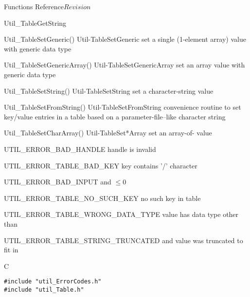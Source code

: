 \begin{cactuspart}{ Functions Reference}{}{$Revision$}
\begin{FunctionDescription}{Util\_TableGetString}
\begin{SeeAlsoSection}
\begin{SeeAlso2} {Util\_TableSetGeneric()} {Util-TableSetGeneric}
set a single (1-element array) value with generic data type
\end{SeeAlso2}
\begin{SeeAlso2} {Util\_TableSetGenericArray()} {Util-TableSetGenericArray}
set an array value with generic data type
\end{SeeAlso2}
\begin{SeeAlso2} {Util\_TableSetString()} {Util-TableSetString}
set a character-string value
\end{SeeAlso2}
\begin{SeeAlso2} {Util\_TableSetFromString()} {Util-TableSetFromString}
convenience routine to set key/value entries in a table based on a
parameter-file--like character string
\end{SeeAlso2}
\begin{SeeAlso2} {Util\_TableSetCharArray()} {Util-TableSet*Array}
set an array-of- value
\end{SeeAlso2}
\end{SeeAlsoSection}

\begin{ErrorSection}
\begin{Error}{UTIL\_ERROR\_BAD\_HANDLE}
handle is invalid
\end{Error}
\begin{Error}{UTIL\_ERROR\_TABLE\_BAD\_KEY}
key contains '/' character
\end{Error}
\begin{Error}{UTIL\_ERROR\_BAD\_INPUT}
 and  $\le 0$
\end{Error}
\begin{Error}{UTIL\_ERROR\_TABLE\_NO\_SUCH\_KEY}
no such key in table
\end{Error}
\begin{Error}{UTIL\_ERROR\_TABLE\_WRONG\_DATA\_TYPE}
value has data type other than 
\end{Error}
\begin{Error}{UTIL\_ERROR\_TABLE\_STRING\_TRUNCATED}
\quad
{} and value was truncated to fit in 
\end{Error}
\end{ErrorSection}

\begin{ExampleSection}
\begin{Example}{C}
\begin{verbatim}
#include "util_ErrorCodes.h"
#include "util_Table.h"


\end{verbatim}
\end{Example}
\end{ExampleSection}
\end{FunctionDescription}
\end{cactuspart}

